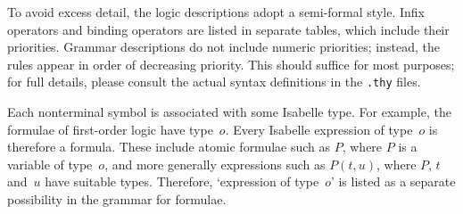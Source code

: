 To avoid excess detail, the logic descriptions adopt a semi-formal style.
Infix operators and binding operators are listed in separate tables, which
include their priorities.  Grammar descriptions do not include numeric
priorities; instead, the rules appear in order of decreasing priority.
This should suffice for most purposes; for full details, please consult the
actual syntax definitions in the {\tt.thy} files.

Each nonterminal symbol is associated with some Isabelle type.  For
example, the formulae of first-order logic have type~$o$.  Every
Isabelle expression of type~$o$ is therefore a formula.  These include
atomic formulae such as $P$, where $P$ is a variable of type~$o$, and more
generally expressions such as $P(t,u)$, where $P$, $t$ and~$u$ have
suitable types.  Therefore, `expression of type~$o$' is listed as a
separate possibility in the grammar for formulae.


